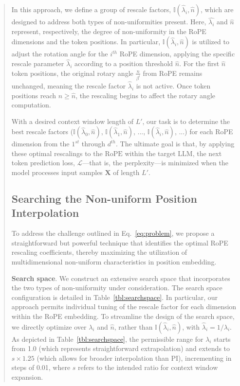 \begin{abstract}
In this approach, we define a group of rescale factors, $\mathbb{I}(\hat{\lambda}_{i},\hat{n})$, which are designed to address both types of non-uniformities present. Here, $\hat{\lambda_i}$ and $\hat{n}$ represent, respectively, the degree of non-uniformity in the RoPE dimensions and the token positions. In particular, $\mathbb{I}(\hat{\lambda}_{i},\hat{n})$ is utilized to adjust the rotation angle for the $i^{th}$ RoPE dimension, applying the specific rescale parameter $\hat\lambda_{i}$ according to a position threshold $\hat{n}$. For the first $\hat{n}$ token positions, the original rotary angle $\frac{n}{\beta^i}$ from RoPE remains unchanged, meaning the rescale factor $\hat\lambda_{i}$ is not active. Once token positions reach $n\ge\hat{n}$, the rescaling begins to affect the rotary angle computation.

With a desired context window length of $L'$, our task is to determine the best rescale factors ($\mathbb{I}(\hat{\lambda}_{0},\hat{n})$, $\mathbb{I}(\hat{\lambda}_{1},\hat{n})$, ..., $\mathbb{I}(\hat{\lambda}_{i},\hat{n})$, ...) for each RoPE dimension from the $1^{st}$ through $d^{th}$. The ultimate goal is that, by applying these optimal rescalings to the $\text{RoPE}$ within the target $\text{LLM}$, the next token prediction loss, $\mathcal{L}$—that is, the perplexity—is minimized when the model processes input samples $\mathbf{X}$ of length $L'$.

\subsection{Searching the Non-uniform Position Interpolation}

To address the challenge outlined in Eq.~\ref{eq:problem}, we propose a straightforward but powerful technique that identifies the optimal RoPE rescaling coefficients, thereby maximizing the utilization of multidimensional non-uniform characteristics in position embedding.

\textbf{Search space}. We construct an extensive search space that incorporates the two types of non-uniformity under consideration. The search space configuration is detailed in Table~\ref{tbl:searchspace}. In particular, our approach permits individual tuning of the rescale factor for each dimension within the RoPE embedding. To streamline the design of the search space, we directly optimize over $\lambda_i$ and $\hat{n}$, rather than $\mathbb{I}(\hat{\lambda}_{i},\hat{n})$, with $\hat{\lambda}_{i}=1/\lambda_i$. As depicted in Table~\ref{tbl:searchspace}, the permissible range for $\lambda_i$ starts from 1.0 (which represents straightforward extrapolation) and extends to $s\times1.25$ (which allows for broader interpolation than PI), incrementing in steps of 0.01, where $s$ refers to the intended ratio for context window expansion.


\end{abstract}
